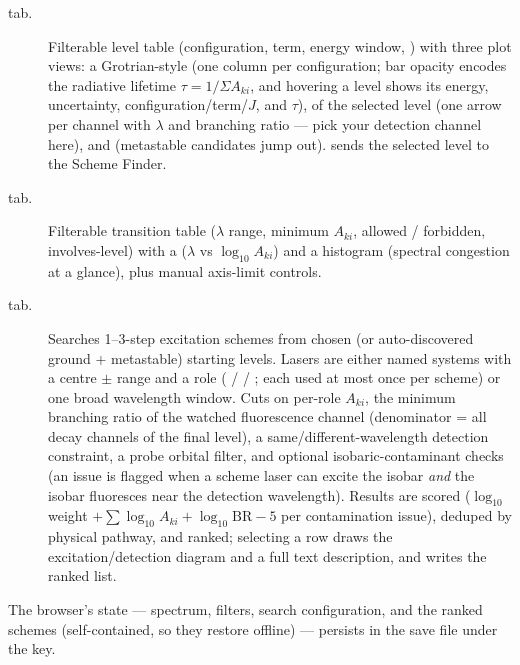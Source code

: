 \begin{description}
    \item[ tab.] Filterable level table (configuration,
        term, energy window, ) with three plot
        views: a Grotrian-style  (one column per
        configuration; bar opacity encodes the radiative lifetime
        $\tau = 1/\Sigma A_{ki}$, and hovering a level shows its
        energy, uncertainty, configuration/term/$J$, and $\tau$),
         of the selected level (one arrow per
        channel with $\lambda$ and branching ratio --- pick your
        detection channel here), and 
        (metastable candidates jump out).  sends the selected level to the Scheme Finder.
    \item[ tab.] Filterable transition table
        ($\lambda$ range, minimum $A_{ki}$, allowed / forbidden,
        involves-level) with a 
        ($\lambda$ vs $\log_{10} A_{ki}$) and a 
        histogram (spectral congestion at a glance), plus manual
        axis-limit controls.
    \item[ tab.] Searches 1--3-step excitation
        schemes from chosen (or auto-discovered ground + metastable)
        starting levels. Lasers are either named systems with a
        centre $\pm$ range and a role ( /  /
        ; each used at most once per scheme) or one broad
        wavelength window. Cuts on per-role $A_{ki}$, the minimum
        branching ratio of the watched fluorescence channel
        (denominator = all decay channels of the final level), a
        same/different-wavelength detection constraint, a probe
        orbital filter, and optional isobaric-contaminant checks
        (an issue is flagged when a scheme laser can excite the
        isobar \emph{and} the isobar fluoresces near the detection
        wavelength). Results are scored
        ($\log_{10}$ weight $+ \sum \log_{10} A_{ki} +
        \log_{10}\mathrm{BR} - 5$ per contamination issue), deduped
        by physical pathway, and ranked; selecting a row draws the
        excitation/detection diagram and a full text description,
        and  writes the ranked list.
\end{description}

The browser's state --- spectrum, filters, search configuration, and
the ranked schemes (self-contained, so they restore offline) ---
persists in the \denis{} save file under the  key.

